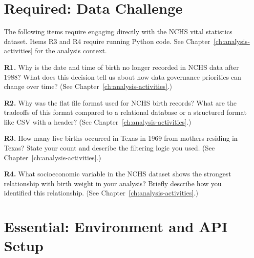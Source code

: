 \begin{Form}
\section{Required: Data Challenge}
\label{sec:assess-required}

The following items require engaging directly with the NCHS vital
statistics dataset. Items R3 and R4 require running Python code.
See Chapter~\ref{ch:analysis-activities} for the analysis context.

\vs

\noindent\textbf{R1.} Why is the date and time of birth no longer
recorded in NCHS data after 1988? What does this decision tell us
about how data governance priorities can change over time?
(See Chapter~\ref{ch:analysis-activities}.)\\[4pt]
\TextField[name=r1,width=\linewidth,height=3cm,multiline=true,
           bordercolor=black]{}

\vs

\noindent\textbf{R2.} Why was the flat file format used for NCHS
birth records? What are the tradeoffs of this format compared to a
relational database or a structured format like CSV with a header?
(See Chapter~\ref{ch:analysis-activities}.)\\[4pt]
\TextField[name=r2,width=\linewidth,height=3cm,multiline=true,
           bordercolor=black]{}

\vs

\noindent\textbf{R3.} How many live births occurred in Texas in 1969
from mothers residing in Texas? State your count and describe the
filtering logic you used.
(See Chapter~\ref{ch:analysis-activities}.)\\[4pt]
\TextField[name=r3,width=\linewidth,height=3cm,multiline=true,
           bordercolor=black]{}

\vs

\noindent\textbf{R4.} What socioeconomic variable in the NCHS dataset
shows the strongest relationship with birth weight in your analysis?
Briefly describe how you identified this relationship.
(See Chapter~\ref{ch:analysis-activities}.)\\[4pt]
\TextField[name=r4,width=\linewidth,height=3cm,multiline=true,
           bordercolor=black]{}

\section{Essential: Environment and API Setup}
\label{sec:assess-essential}


\end{Form}
